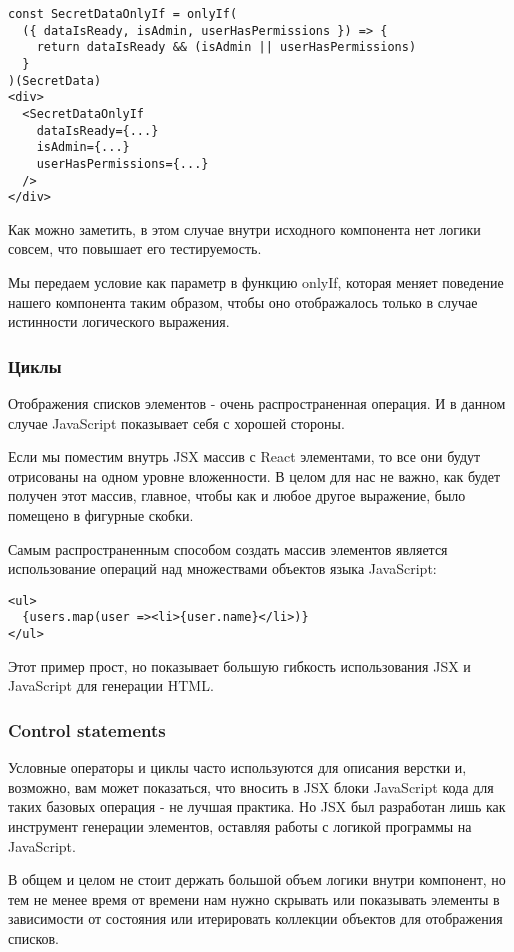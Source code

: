 \documentclass[12pt]{book}
\begin{document}
\begin{lstlisting}
const SecretDataOnlyIf = onlyIf(
  ({ dataIsReady, isAdmin, userHasPermissions }) => {
    return dataIsReady && (isAdmin || userHasPermissions)
  }
)(SecretData)
<div>
  <SecretDataOnlyIf
    dataIsReady={...}
    isAdmin={...}
    userHasPermissions={...}
  /> 
</div>
\end{lstlisting}

Как можно заметить, в этом случае внутри исходного компонента нет логики совсем, что повышает его тестируемость.

Мы передаем условие как параметр в функцию onlyIf, которая меняет поведение нашего компонента таким образом, чтобы оно отображалось только в случае истинности логического выражения.

\subsubsection*{Циклы}

Отображения списков элементов - очень распространенная операция. И в данном случае JavaScript показывает себя с хорошей стороны.

Если мы поместим внутрь JSX массив с React элементами, то все они будут отрисованы на одном уровне вложенности. В целом для нас не важно, как будет получен этот массив, главное, чтобы как и любое другое выражение, было помещено в фигурные скобки.

Самым распространенным способом создать массив элементов является использование операций над множествами объектов языка JavaScript:

\begin{lstlisting}
<ul>
  {users.map(user =><li>{user.name}</li>)}
</ul>
\end{lstlisting}

Этот пример прост, но показывает большую гибкость использования JSX и JavaScript для генерации HTML.

\subsubsection*{Control statements}

Условные операторы и циклы часто используются для описания верстки и, возможно, вам может показаться, что вносить в JSX блоки JavaScript кода для таких базовых операция - не лучшая практика. Но JSX был разработан лишь как инструмент генерации элементов, оставляя работы с логикой программы на JavaScript.

В общем и целом не стоит держать большой объем логики внутри компонент, но тем не менее время от времени нам нужно скрывать или показывать элементы в зависимости от состояния или итерировать коллекции объектов для отображения списков. 
\end{document}
